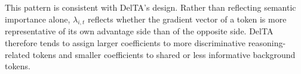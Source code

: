 \documentclass{llmxive}
\begin{document}
This pattern is consistent with DelTA's design. Rather than reflecting semantic importance alone, \(\lambda_{i,t}\) reflects whether the gradient vector of a token is more representative of its own advantage side than of the opposite side. DelTA therefore tends to assign larger coefficients to more discriminative reasoning-related tokens and smaller coefficients to shared or less informative background tokens.
\end{document}
